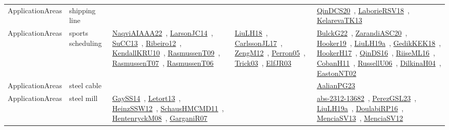 {\begin{longtable}{lp{3cm}>{\raggedright\arraybackslash}p{6cm}>{\raggedright\arraybackslash}p{6cm}>{\raggedright\arraybackslash}p{8cm}}
\index{shipping line}\index{ApplicationAreas!shipping line}ApplicationAreas & shipping line &  &  & \href{../works/QinDCS20.pdf}{QinDCS20}~\cite{QinDCS20}, \href{../works/LaborieRSV18.pdf}{LaborieRSV18}~\cite{LaborieRSV18}, \href{../works/KelarevaTK13.pdf}{KelarevaTK13}~\cite{KelarevaTK13}\\
\index{sports scheduling}\index{ApplicationAreas!sports scheduling}ApplicationAreas & sports scheduling & \href{../works/NaqviAIAAA22.pdf}{NaqviAIAAA22}~\cite{NaqviAIAAA22}, \href{../works/LarsonJC14.pdf}{LarsonJC14}~\cite{LarsonJC14}, \href{../works/SuCC13.pdf}{SuCC13}~\cite{SuCC13}, \href{../works/Ribeiro12.pdf}{Ribeiro12}~\cite{Ribeiro12}, \href{../works/KendallKRU10.pdf}{KendallKRU10}~\cite{KendallKRU10}, \href{../works/RasmussenT09.pdf}{RasmussenT09}~\cite{RasmussenT09}, \href{../works/RasmussenT07.pdf}{RasmussenT07}~\cite{RasmussenT07}, \href{../works/RasmussenT06.pdf}{RasmussenT06}~\cite{RasmussenT06} & \href{../works/LiuLH18.pdf}{LiuLH18}~\cite{LiuLH18}, \href{../works/CarlssonJL17.pdf}{CarlssonJL17}~\cite{CarlssonJL17}, \href{../works/ZengM12.pdf}{ZengM12}~\cite{ZengM12}, \href{../works/Perron05.pdf}{Perron05}~\cite{Perron05}, \href{../works/Trick03.pdf}{Trick03}~\cite{Trick03}, \href{../works/ElfJR03.pdf}{ElfJR03}~\cite{ElfJR03} & \href{../works/BulckG22.pdf}{BulckG22}~\cite{BulckG22}, \href{../works/ZarandiASC20.pdf}{ZarandiASC20}~\cite{ZarandiASC20}, \href{../works/Hooker19.pdf}{Hooker19}~\cite{Hooker19}, \href{../works/LiuLH19a.pdf}{LiuLH19a}~\cite{LiuLH19a}, \href{../works/GedikKEK18.pdf}{GedikKEK18}~\cite{GedikKEK18}, \href{../works/HookerH17.pdf}{HookerH17}~\cite{HookerH17}, \href{../works/QinDS16.pdf}{QinDS16}~\cite{QinDS16}, \href{../works/RiiseML16.pdf}{RiiseML16}~\cite{RiiseML16}, \href{../works/CobanH11.pdf}{CobanH11}~\cite{CobanH11}, \href{../works/RussellU06.pdf}{RussellU06}~\cite{RussellU06}, \href{../works/DilkinaH04.pdf}{DilkinaH04}~\cite{DilkinaH04}, \href{../works/EastonNT02.pdf}{EastonNT02}~\cite{EastonNT02}\\
\index{steel cable}\index{ApplicationAreas!steel cable}ApplicationAreas & steel cable &  &  & \href{../works/AalianPG23.pdf}{AalianPG23}~\cite{AalianPG23}\\
\index{steel mill}\index{ApplicationAreas!steel mill}ApplicationAreas & steel mill & \href{../works/GaySS14.pdf}{GaySS14}~\cite{GaySS14}, \href{../works/Letort13.pdf}{Letort13}~\cite{Letort13}, \href{../works/HeinzSSW12.pdf}{HeinzSSW12}~\cite{HeinzSSW12}, \href{../works/SchausHMCMD11.pdf}{SchausHMCMD11}~\cite{SchausHMCMD11}, \href{../works/HentenryckM08.pdf}{HentenryckM08}~\cite{HentenryckM08}, \href{../works/GarganiR07.pdf}{GarganiR07}~\cite{GarganiR07} &  & \href{../works/abs-2312-13682.pdf}{abs-2312-13682}~\cite{abs-2312-13682}, \href{../works/PerezGSL23.pdf}{PerezGSL23}~\cite{PerezGSL23}, \href{../works/LiuLH19a.pdf}{LiuLH19a}~\cite{LiuLH19a}, \href{../works/DoulabiRP16.pdf}{DoulabiRP16}~\cite{DoulabiRP16}, \href{../works/MenciaSV13.pdf}{MenciaSV13}~\cite{MenciaSV13}, \href{../works/MenciaSV12.pdf}{MenciaSV12}~\cite{MenciaSV12}\\

\end{longtable}}
